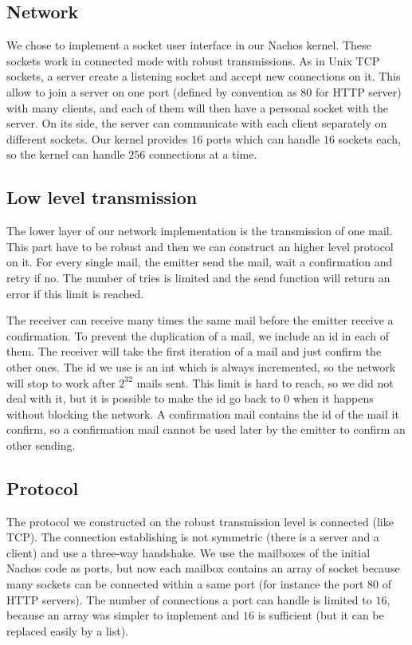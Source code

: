 \subsection{Network}
We chose to implement a socket user interface in our Nachos kernel. These
sockets work in connected mode with robust transmissions.
As in Unix TCP sockets, a server create a listening socket and accept new
connections on it. This allow to join a server on one port (defined by
convention as $80$ for HTTP server) with many clients, and each of them will then
have a personal socket with the server.
On its side, the server can communicate with each client separately on
different sockets.  Our kernel provides $16$ ports which can handle $16$ sockets
each, so the kernel can handle $256$ connections at a time.

\subsection{Low level transmission}
The lower layer of our network implementation is the transmission of one mail.
This part have to be robust and then we can construct an higher level protocol
on it.
For every single mail, the emitter send the mail, wait a confirmation and retry
if no. The number of tries is limited and the send function will return an
error if this limit is reached.

The receiver can receive many times the same mail before the emitter receive a
confirmation. To prevent the duplication of a mail, we include an id in each of
them. The receiver will take the first iteration of a mail and just confirm the
other ones.
The id we use is an int which is always incremented, so the network will stop
to work after $2^{32}$ mails sent. This limit is hard to reach, so we did not
deal with it, but it is possible to make the id go back to $0$ when it happens
without blocking the network.
A confirmation mail contains the id of the mail it confirm, so a confirmation
mail cannot be used later by the emitter to confirm an other sending.

\subsection{Protocol}
The protocol we constructed on the robust transmission level is connected (like
TCP). The connection establishing is not symmetric (there is a server and a
client) and use a three-way handshake.  We use the mailboxes of the initial
Nachos code as ports, but now each mailbox contains an array of socket because
many sockets can be connected within a same port (for instance the port $80$ of
HTTP servers).  The number of connections a port can handle is limited to $16$,
because an array was simpler to implement and $16$ is sufficient (but it can be
replaced easily by a list).

